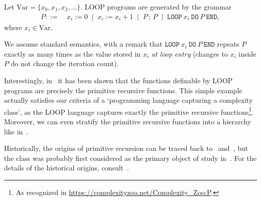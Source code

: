 \begin{definition}
Let \(\mathrm{Var}=\{x_0,x_1,x_2,\dots\}\).
LOOP programs are generated by the grammar
\[
\begin{aligned}
P ::=~& x_i := 0
\;\mid\; x_i := x_i + 1
\;\mid\; P \,;\, P
\;\mid\; \texttt{LOOP}~x_i~\texttt{DO}~P~\texttt{END},
\end{aligned}
\]
where \(x_i\in\mathrm{Var}\).

\noindent
We assume standard semantics, with a remark that \(\texttt{LOOP}~x_i~\texttt{DO}~P~\texttt{END}\) repeats \(P\) exactly as many times as the value stored in \(x_i\) \emph{at loop entry} (changes to \(x_i\) inside \(P\) do not change the iteration count).
\end{definition}

Interestingly, in~\cite{10.1145/800196.806014} it has been shown that the functions definable by LOOP programs
are precisely the primitive recursive functions.
This simple example actually satisfies our criteria of a `programming language capturing a complexity class', as
the LOOP language captures exactly the primitive recursive functions\footnote{As recognized in \url{https://complexityzoo.net/Complexity_Zoo:P}.}.
Moreover, we can even stratify the primitive recursive functions into a hierarchy like in~\cite{Grzegorczyk1953}.


Historically, the origins of primitive recursion can be traced back to~\cite{Grassmann1861} and~\cite{Dedekind1888},
but the class was probably first considered as the primary object of study in~\cite{Skolem1923-vanHeijenoort}.
For the details of the historical origins, consult~\cite{Adams2011}.




